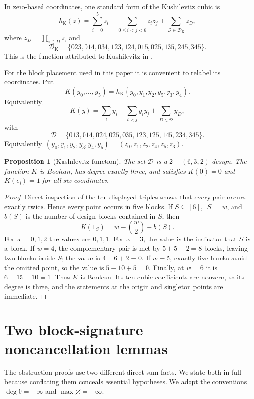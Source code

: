 \documentclass[11pt]{article}
\newtheorem{proposition}[theorem]{Proposition}
\theoremstyle{definition}
\begin{document}
In zero-based coordinates, one standard form of the Kushilevitz cubic is
\[
 h_{\mathrm K}(z)
 =\sum_{i=0}^{5}z_i-\sum_{0\le i<j<6}z_iz_j
 +\sum_{D\in\mathcal D_{\mathrm K}}z_D,
\]
where \(z_D=\prod_{i\in D}z_i\) and
\[
\mathcal D_{\mathrm K}
=\{023,014,034,123,124,015,025,135,245,345\}.
\]
This is the function attributed to Kushilevitz in
\cite{NisanWigderson1995,HatamiKulkarniPankratov2011}.

For the block placement used in this paper it is convenient to relabel its
coordinates.  Put
\[
 K(y_0,\ldots,y_5)=h_{\mathrm K}(y_0,y_1,y_2,y_5,y_3,y_4).
\]
Equivalently,
\[
 K(y)=\sum_i y_i-\sum_{i<j}y_iy_j+\sum_{D\in\mathcal D}y_D,
\]
with
\[
 \mathcal D=\{013,014,024,025,035,123,125,145,234,345\}.
\]
Equivalently,
\((y_0,y_1,y_2,y_3,y_4,y_5)=(z_0,z_1,z_2,z_4,z_5,z_3)\).

\begin{proposition}[Kushilevitz function]\label{prop:K}
The set \(\mathcal D\) is a \(2\!-(6,3,2)\) design.  The function \(K\) is
Boolean, has degree exactly three, and satisfies
\(K(0)=0\) and \(K(e_i)=1\) for all six coordinates.
\end{proposition}

\begin{proof}
Direct inspection of the ten displayed triples shows that every pair occurs
exactly twice.  Hence every point occurs in five blocks.  If
\(S\subseteq[6]\), \(|S|=w\), and \(b(S)\) is the number of design blocks
contained in \(S\), then
\[
 K(1_S)=w-\binom w2+b(S).
\]
For \(w=0,1,2\) the values are \(0,1,1\).  For \(w=3\), the value is the
indicator that \(S\) is a block.  If \(w=4\), the complementary pair is met by
\(5+5-2=8\) blocks, leaving two blocks inside \(S\); the value is
\(4-6+2=0\).  If \(w=5\), exactly five blocks avoid the omitted point, so the
value is \(5-10+5=0\).  Finally, at \(w=6\) it is \(6-15+10=1\).
Thus \(K\) is Boolean.  Its ten cubic coefficients are nonzero, so its degree
is three, and the statements at the origin and singleton points are immediate.
\end{proof}

\section{Two block-signature noncancellation lemmas}\label{sec:signatures}

The obstruction proofs use two different direct-sum facts.  We state both in
full because conflating them conceals essential hypotheses.
We adopt the conventions \(\deg 0=-\infty\) and
\(\max\varnothing=-\infty\).
\end{document}
